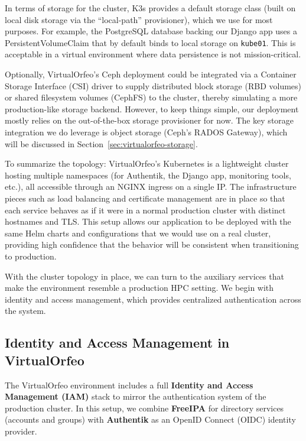 \medskip

In terms of storage for the cluster, K3s provides a default storage class (built 
on local disk storage via the ``local-path'' provisioner), which we use for most 
purposes. For example, the PostgreSQL database backing our Django app uses a 
PersistentVolumeClaim that by default binds to local storage on 
\texttt{kube01}. This is acceptable in a virtual environment where data 
persistence is not mission-critical. 

Optionally, VirtualOrfeo’s Ceph deployment could be integrated via a Container 
Storage Interface (CSI) driver to supply distributed block storage (RBD volumes) 
or shared filesystem volumes (CephFS) to the cluster, thereby simulating a more 
production-like storage backend. However, to keep things simple, our deployment 
mostly relies on the out-of-the-box storage provisioner for now. The key storage 
integration we do leverage is object storage (Ceph’s RADOS Gateway), which will 
be discussed in Section~\ref{sec:virtualorfeo-storage}.

\medskip

To summarize the topology: VirtualOrfeo’s Kubernetes is a lightweight cluster 
hosting multiple namespaces (for Authentik, the Django app, monitoring tools, 
etc.), all accessible through an NGINX ingress on a single IP. The infrastructure 
pieces such as load balancing and certificate management are in place so that 
each service behaves as if it were in a normal production cluster with distinct 
hostnames and TLS. This setup allows our application to be deployed with the 
same Helm charts and configurations that we would use on a real cluster, 
providing high confidence that the behavior will be consistent when transitioning 
to production.


\medskip
\noindent With the cluster topology in place, we can turn to the auxiliary services 
that make the environment resemble a production HPC setting. 
We begin with identity and access management, which provides 
centralized authentication across the system.

\subsection{Identity and Access Management in VirtualOrfeo} \label{sec:virtualorfeo-iam}

The VirtualOrfeo environment includes a full \textbf{Identity and Access Management (IAM)} stack to mirror the authentication system of the production cluster. In this setup, we combine \textbf{FreeIPA} for directory services (accounts and groups) with \textbf{Authentik} as an OpenID Connect (OIDC) identity provider. 

